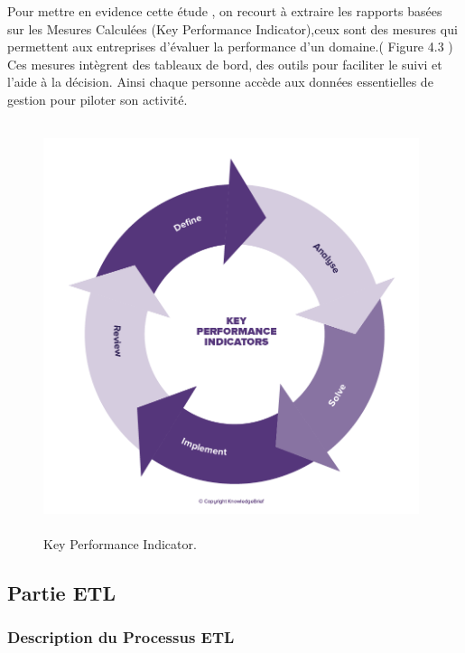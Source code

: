 Pour mettre en evidence cette \'{e}tude  , on recourt \`{a} extraire les rapports bas\'{e}es sur
les Mesures Calcul\'{e}es (Key Performance Indicator),ceux sont des mesures qui permettent aux entreprises d'\'{e}valuer la performance d'un
domaine.( Figure 4.3 ) \newline
Ces mesures int\`{e}grent des tableaux de bord, des outils pour faciliter le suivi et l'aide
\`{a} la d\'{e}cision. Ainsi chaque personne acc\`{e}de aux donn\'{e}es essentielles de gestion pour
piloter son activit\'{e}.



\begin{figure}[H]
\center
\includegraphics[width=11cm,height=12cm]{./figures/kpi.png}
\caption{Key Performance Indicator.}
\end{figure}


\subsection{ Partie ETL }

\subsubsection{Description du Processus ETL }

